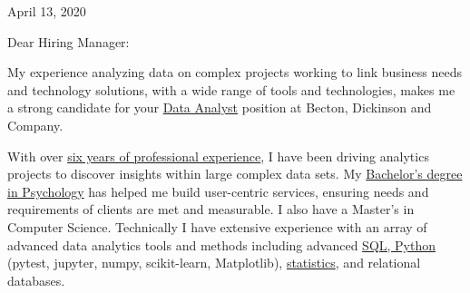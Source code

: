 \documentclass[letterpaper]{article}
\newcommand{\impt}[1]{\uline{#1}}
\newcommand{\CVjobTitle}{Data Analyst}
\newcommand{\CVcompany}{Becton, Dickinson and Company}
\begin{document}
\large

\null\hfill April 13, 2020
\vspace{1em}

Dear Hiring Manager:




My experience analyzing data on complex projects working to link business needs
and technology solutions, with a wide range of tools and technologies, makes me
a strong candidate for your \impt{\CVjobTitle} position at \CVcompany.

With over \impt{six years of professional experience}, I have been driving
analytics projects to discover insights within large complex data sets.  
My \impt{Bachelor's degree in Psychology} has helped me build user-centric services,
ensuring needs and requirements of clients are met and measurable.  
I also have a Master's in Computer Science.
Technically I have extensive experience with an array of advanced data analytics
tools and methods including advanced \impt{SQL, Python} (pytest, jupyter, numpy,
scikit-learn, Matplotlib), \impt{statistics}, and relational databases. 
\end{document}
